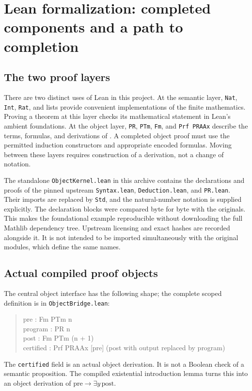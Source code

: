 \section{Lean formalization: completed components and a path to completion}
\label{sec:formalization}

\subsection{The two proof layers}

There are two distinct uses of Lean in this project.  At the semantic layer,
\texttt{Nat}, \texttt{Int}, \texttt{Rat}, and lists provide convenient
implementations of the finite mathematics.  Proving a theorem at this
layer checks its mathematical statement in Lean's ambient foundations.
At the object layer, \texttt{PR}, \texttt{PTm}, \texttt{Fm}, and
\texttt{Prf PRAAx} describe the terms, formulas, and derivations of
\ipra.  A completed object proof must use the permitted induction
constructors and appropriate encoded formulas.  Moving between these
layers requires construction of a derivation, not a change of notation.

The standalone \texttt{ObjectKernel.lean} in this archive contains the
declarations and proofs of the pinned upstream \texttt{Syntax.lean},
\texttt{Deduction.lean}, and \texttt{PR.lean}.  Their imports are replaced
by \texttt{Std}, and the natural-number notation is supplied explicitly.
The declaration blocks were compared byte for byte with the originals.
This makes the foundational example reproducible without downloading the
full Mathlib dependency tree.  Upstream licensing and exact hashes are
recorded alongside it.  It is not intended to be imported simultaneously
with the original modules, which define the same names.

\subsection{Actual compiled proof objects}

The central object interface has the following shape; the complete scoped
definition is in \texttt{ObjectBridge.lean}:
\begin{quote}\small\ttfamily
pre : Fm PTm n\\
program : PR n\\
post : Fm PTm (n + 1)\\
certified : Prf PRAAx [pre] (post with output replaced by program)
\end{quote}
The \texttt{certified} field is an actual object derivation.  It is not a
Boolean check of a semantic proposition.  The compiled existential
introduction lemma turns this into an object derivation of
\(\mathrm{pre}\to\exists y\,\mathrm{post}\).


